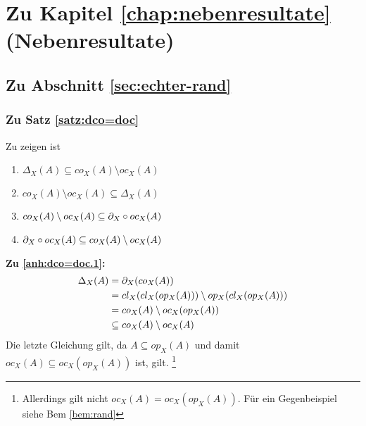 \section{Zu Kapitel \ref{chap:nebenresultate} (Nebenresultate)}

\subsection{Zu Abschnitt \ref{sec:echter-rand}}


\subsubsection{Zu Satz \ref{satz:dco=doc}} \label{anh:doc=doc} 
Zu zeigen ist
\begin{enumerate}
	\item $\Delta_X(A) \subseteq co_X(A) \setminus oc_X(A)$ \label{anh:dco=doc.1}
	\item $co_X(A) \setminus oc_X(A) \subseteq \Delta_X(A)$ \label{anh:dco=doc.2}
	\item $co_X(A) \setminus oc_X(A) \subseteq \partial_X \circ oc_X(A)$ \label{anh:dco=doc.3}
	\item $\partial_X \circ oc_X(A) \subseteq co_X(A) \setminus oc_X(A)$\label{anh:dco=doc.4}
\end{enumerate}

\noindent
\textbf{Zu \ref{anh:dco=doc.1}:}
	\begin{align*}
		\Delta_X(A) &= \partial_X(co_X(A)) \\
		&= cl_X(cl_X(op_X(A))) \setminus op_X(cl_X(op_X(A))) \\
		&= co_X(A) \setminus oc_X(op_X(A)) \\
		&\subseteq co_X(A) \setminus oc_X(A)
	\end{align*} 
	Die letzte Gleichung gilt, da $A \subseteq op_X(A)$ und damit $oc_X(A) \subseteq oc_X(op_X(A))$ ist, gilt.
	\footnote{Allerdings gilt nicht $oc_X(A) = oc_X(op_X(A))$. Für ein Gegenbeispiel siehe Bem \ref{bem:rand} }
\\

